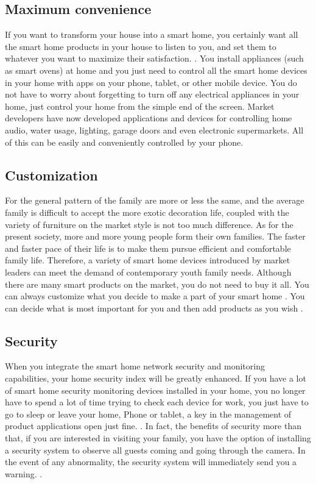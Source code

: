 \documentclass[report]{IEEEtran}
\begin{document}
\subsection{Maximum convenience}
If you want to transform your house into a smart home, you certainly want all the smart home products in your house to listen to you, and set them to whatever you want to maximize their satisfaction. \cite{4}. You install appliances (such as smart ovens) at home and you just need to control all the smart home devices in your home with apps on your phone, tablet, or other mobile device. You do not have to worry about forgetting to turn off any electrical appliances in your home, just control your home from the simple end of the screen. Market developers have now developed applications and devices for controlling home audio, water usage, lighting, garage doors and even electronic supermarkets. All of this can be easily and conveniently controlled by your phone.
\subsection{Customization}
For the general pattern of the family are more or less the same, and the average family is difficult to accept the more exotic decoration life, coupled with the variety of furniture on the market style is not too much difference. As for the present society, more and more young people form their own families. The faster and faster pace of their life is to make them pursue efficient and comfortable family life. Therefore, a variety of smart home devices introduced by market leaders can meet the demand of contemporary youth family needs. Although there are many smart products on the market, you do not need to buy it all.  You can always customize what you decide to make a part of your smart home \cite{5}. You can decide what is most important for you and then add products as you wish \cite{5}.
\subsection{Security}
When you integrate the smart home network security and monitoring capabilities, your home security index will be greatly enhanced. If you have a lot of smart home security monitoring devices installed in your home, you no longer have to spend a lot of time trying to check each device for work, you just have to go to sleep or leave your home, Phone or tablet, a key in the management of product applications open just fine. \cite{6}. In fact, the benefits of security more than that, if you are interested in visiting your family, you have the option of installing a security system to observe all guests coming and going through the camera. In the event of any abnormality, the security system will immediately send you a warning. \cite{7}.
\end{document}
